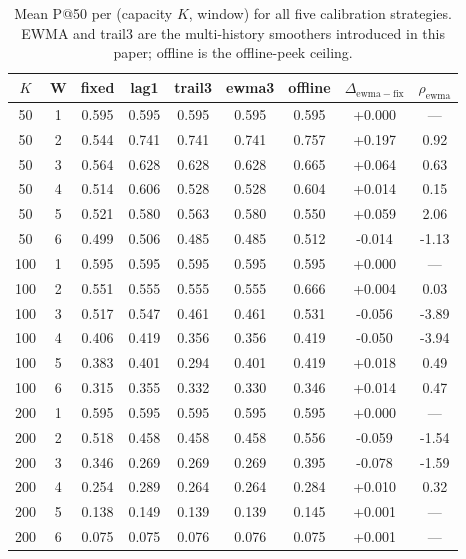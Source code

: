 \begin{table}[!t]
  \caption{Mean P@50 per (capacity $K$, window) for all five calibration strategies. EWMA and trail3 are the multi-history smoothers introduced in this paper; offline is the offline-peek ceiling.}
  \label{tab:main}
  \centering
  \small
  \setlength{\tabcolsep}{5pt}
  \begin{tabular}{cc ccccc cc}
    \toprule
    $K$ & W & fixed & lag1 & trail3 & ewma3 & offline & $\Delta_{\mathrm{ewma\!-\!fix}}$ & $\rho_{\mathrm{ewma}}$ \\
    \midrule
    50 & 1 & 0.595 & 0.595 & 0.595 & 0.595 & 0.595 & +0.000 & --- \\
    50 & 2 & 0.544 & 0.741 & 0.741 & 0.741 & 0.757 & +0.197 & 0.92 \\
    50 & 3 & 0.564 & 0.628 & 0.628 & 0.628 & 0.665 & +0.064 & 0.63 \\
    50 & 4 & 0.514 & 0.606 & 0.528 & 0.528 & 0.604 & +0.014 & 0.15 \\
    50 & 5 & 0.521 & 0.580 & 0.563 & 0.580 & 0.550 & +0.059 & 2.06 \\
    50 & 6 & 0.499 & 0.506 & 0.485 & 0.485 & 0.512 & -0.014 & -1.13 \\
    \midrule
    100 & 1 & 0.595 & 0.595 & 0.595 & 0.595 & 0.595 & +0.000 & --- \\
    100 & 2 & 0.551 & 0.555 & 0.555 & 0.555 & 0.666 & +0.004 & 0.03 \\
    100 & 3 & 0.517 & 0.547 & 0.461 & 0.461 & 0.531 & -0.056 & -3.89 \\
    100 & 4 & 0.406 & 0.419 & 0.356 & 0.356 & 0.419 & -0.050 & -3.94 \\
    100 & 5 & 0.383 & 0.401 & 0.294 & 0.401 & 0.419 & +0.018 & 0.49 \\
    100 & 6 & 0.315 & 0.355 & 0.332 & 0.330 & 0.346 & +0.014 & 0.47 \\
    \midrule
    200 & 1 & 0.595 & 0.595 & 0.595 & 0.595 & 0.595 & +0.000 & --- \\
    200 & 2 & 0.518 & 0.458 & 0.458 & 0.458 & 0.556 & -0.059 & -1.54 \\
    200 & 3 & 0.346 & 0.269 & 0.269 & 0.269 & 0.395 & -0.078 & -1.59 \\
    200 & 4 & 0.254 & 0.289 & 0.264 & 0.264 & 0.284 & +0.010 & 0.32 \\
    200 & 5 & 0.138 & 0.149 & 0.139 & 0.139 & 0.145 & +0.001 & --- \\
    200 & 6 & 0.075 & 0.075 & 0.076 & 0.076 & 0.075 & +0.001 & --- \\
    \bottomrule
  \end{tabular}
\end{table}
